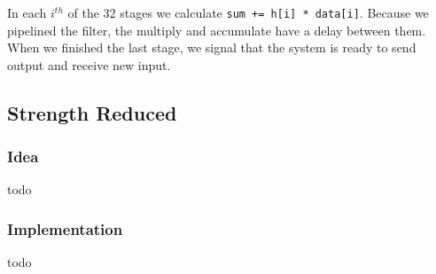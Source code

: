 In each $i^{th}$ of the 32 stages we calculate \texttt{sum += h[i] * data[i]}. Because we pipelined the filter, the multiply and accumulate have a delay between them. When we finished the last stage, we signal that the system is ready to send output and receive new input.
\subsection{Strength Reduced }
\subsubsection{Idea}
todo
\subsubsection{Implementation}
todo

